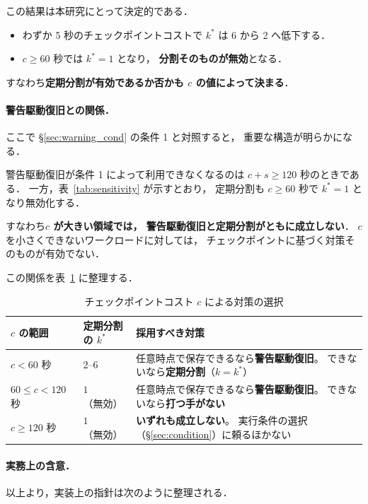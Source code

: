 \documentclass[11pt,a4paper]{ltjsreport}
\begin{document}
この結果は本研究にとって決定的である．

\begin{itemize}
  \item わずか 5 秒のチェックポイントコストで
        $k^{*}$ は 6 から 2 へ低下する．
  \item $c \geq 60$ 秒では $k^{*} = 1$ となり，
        \textbf{分割そのものが無効}となる．
\end{itemize}

すなわち\textbf{定期分割が有効であるか否かも $c$ の値によって決まる}．

\paragraph{警告駆動復旧との関係．}
ここで \S\ref{sec:warning_cond} の条件 1 と対照すると，
重要な構造が明らかになる．

警告駆動復旧が条件 1 によって利用できなくなるのは
$c + s \geq 120$ 秒のときである．
一方，表~\ref{tab:sensitivity} が示すとおり，
定期分割も $c \geq 60$ 秒で $k^{*} = 1$ となり無効化する．

すなわち\textbf{$c$ が大きい領域では，
警告駆動復旧と定期分割がともに成立しない}．
$c$ を小さくできないワークロードに対しては，
チェックポイントに基づく対策そのものが有効でない．

この関係を表~\ref{tab:c_regime} に整理する．

\begin{table}[htbp]
\centering
\caption{チェックポイントコスト $c$ による対策の選択}
\label{tab:c_regime}
\small
\begin{tabularx}{\textwidth}{@{}llX@{}}
\toprule
$c$ の範囲 & 定期分割の $k^{*}$ & 採用すべき対策 \\
\midrule
$c < 60$ 秒
  & $2$--$6$
  & 任意時点で保存できるなら\textbf{警告駆動復旧}。
    できないなら\textbf{定期分割}（$k = k^{*}$） \\
\addlinespace
$60 \leq c < 120$ 秒
  & $1$（無効）
  & 任意時点で保存できるなら\textbf{警告駆動復旧}。
    できないなら\textbf{打つ手がない} \\
\addlinespace
$c \geq 120$ 秒
  & $1$（無効）
  & \textbf{いずれも成立しない}。
    実行条件の選択（\S\ref{sec:condition}）に頼るほかない \\
\bottomrule
\end{tabularx}
\end{table}

\paragraph{実務上の含意．}
以上より，実装上の指針は次のように整理される．
\end{document}
